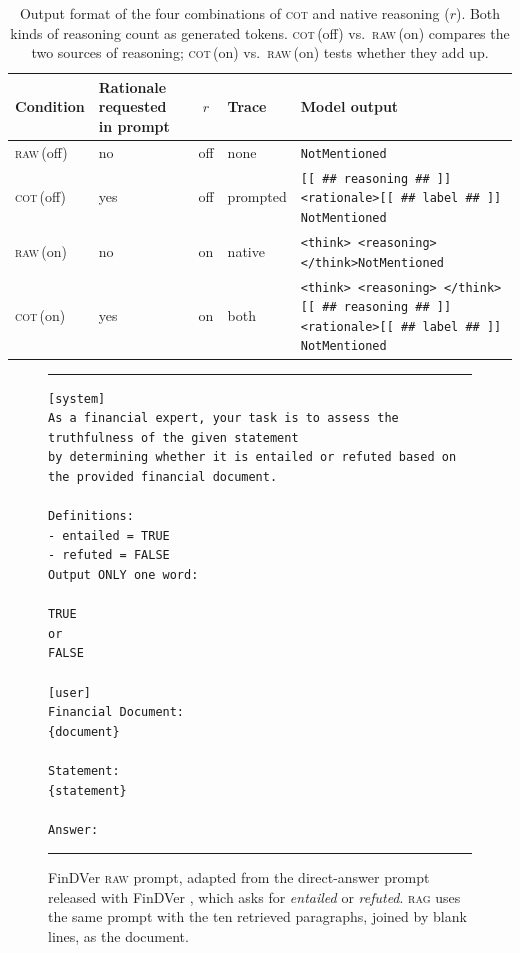 \documentclass[11pt]{article}
\begin{document}
\begin{table}[H]
\centering
\footnotesize
\setlength{\tabcolsep}{5pt}
\renewcommand{\arraystretch}{1.25}
\begin{tabular}{l>{\centering\arraybackslash}p{1.9cm}c>{\raggedright\arraybackslash}p{2.4cm}>{\raggedright\arraybackslash}p{6.8cm}}
\toprule
\textbf{Condition} & \textbf{Rationale requested in prompt} & $r$ & \textbf{Trace} & \textbf{Model output} \\
\midrule
\textsc{raw}\,(off) & no  & off & none
  & \texttt{NotMentioned} \\
\textsc{cot}\,(off) & yes & off & prompted
  & \texttt{[[ \#\# reasoning \#\# ]] <rationale>}\newline\texttt{[[ \#\# label \#\# ]] NotMentioned} \\
\textsc{raw}\,(on)  & no  & on  & native
  & \texttt{<think> <reasoning> </think>}\newline\texttt{NotMentioned} \\
\textsc{cot}\,(on)  & yes & on  & both
  & \texttt{<think> <reasoning> </think>}\newline\texttt{[[ \#\# reasoning \#\# ]] <rationale>}\newline\texttt{[[ \#\# label \#\# ]] NotMentioned} \\
\bottomrule
\end{tabular}
\caption{Output format of the four combinations of \textsc{cot} and native
reasoning ($r$). Both kinds of reasoning count as generated tokens.
\textsc{cot}\,(off) vs.\ \textsc{raw}\,(on) compares the two sources of
reasoning; \textsc{cot}\,(on) vs.\ \textsc{raw}\,(on) tests whether they
add up.}
\label{tab:reasoning_configs}
\end{table}

\begin{figure}[H]
\centering
\begin{minipage}{0.92\textwidth}
\footnotesize
\hrule\vspace{4pt}
\begin{verbatim}
[system]
As a financial expert, your task is to assess the truthfulness of the given statement
by determining whether it is entailed or refuted based on the provided financial document.

Definitions:
- entailed = TRUE
- refuted = FALSE
Output ONLY one word:

TRUE
or
FALSE

[user]
Financial Document:
{document}

Statement:
{statement}

Answer:
\end{verbatim}
\vspace{2pt}\hrule
\end{minipage}
\caption{FinDVer \textsc{raw} prompt, adapted from the direct-answer
prompt released with FinDVer \citep{zhao-etal-2024-findver}, which asks
for \textit{entailed} or \textit{refuted}. \textsc{rag} uses the same
prompt with the ten retrieved paragraphs, joined by blank lines, as the
document.}
\label{fig:prompt_fv_raw}
\end{figure}
\end{document}
